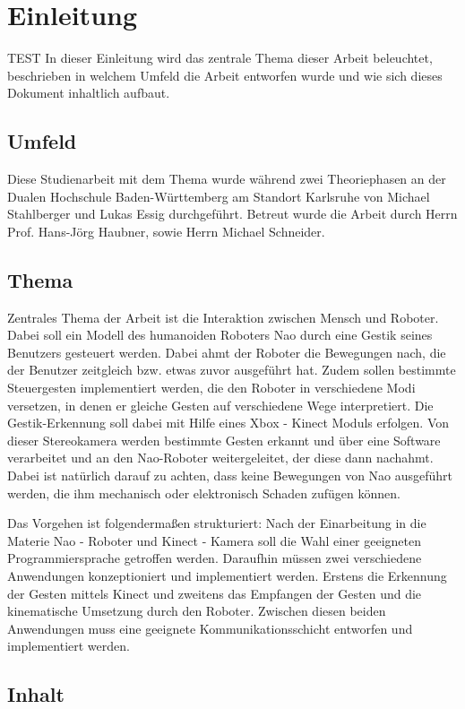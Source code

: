\chapter{Einleitung}      %

TEST
In dieser Einleitung wird das zentrale Thema dieser Arbeit beleuchtet, beschrieben in welchem Umfeld die Arbeit entworfen wurde und wie sich dieses Dokument inhaltlich aufbaut.

\section{Umfeld}
Diese Studienarbeit mit dem Thema \Titel wurde während zwei Theoriephasen an der Dualen Hochschule Baden-Württemberg am Standort Karlsruhe von Michael Stahlberger und Lukas Essig durchgeführt. Betreut wurde die Arbeit durch Herrn Prof. Hans-Jörg Haubner, sowie Herrn Michael Schneider. 

\section{Thema}
Zentrales Thema der Arbeit ist die Interaktion zwischen Mensch und Roboter. Dabei soll ein Modell des humanoiden Roboters Nao durch eine Gestik seines Benutzers gesteuert werden. Dabei ahmt der Roboter die Bewegungen nach, die der Benutzer zeitgleich bzw. etwas zuvor ausgeführt hat. Zudem sollen bestimmte Steuergesten implementiert werden, die den Roboter in verschiedene Modi versetzen, in denen er gleiche Gesten auf verschiedene Wege interpretiert. Die Gestik-Erkennung soll dabei mit Hilfe eines Xbox - Kinect Moduls erfolgen. Von dieser Stereokamera werden bestimmte Gesten erkannt und über eine Software verarbeitet und an den Nao-Roboter weitergeleitet, der diese dann nachahmt. Dabei ist natürlich darauf zu achten, dass keine Bewegungen von Nao ausgeführt werden, die ihm mechanisch oder elektronisch Schaden zufügen können.

Das Vorgehen ist folgendermaßen strukturiert: Nach der Einarbeitung in die Materie Nao - Roboter und Kinect - Kamera soll die Wahl einer geeigneten Programmiersprache getroffen werden. Daraufhin müssen zwei verschiedene Anwendungen konzeptioniert und implementiert werden. Erstens die Erkennung der Gesten mittels Kinect und zweitens das Empfangen der Gesten und die kinematische Umsetzung durch den Roboter. Zwischen diesen beiden Anwendungen muss eine geeignete Kommunikationsschicht entworfen und implementiert werden.

\section{Inhalt}


